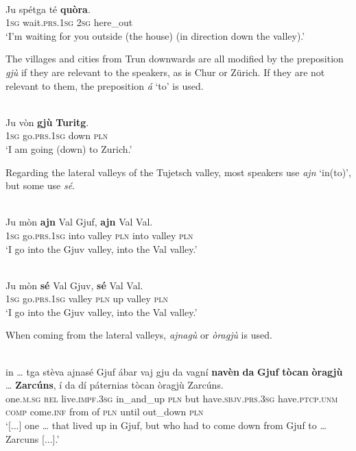 \ea
\label{}
\\
\gll Ju spétga té \textbf{quòra}.\\
\textsc{1sg} wait.\textsc{prs.1sg} \textsc{2sg} here\_out\\
\glt `I'm waiting for you outside (the house) (in direction down the valley).'
\z

The villages and cities from Trun downwards are all modified by the preposition \textit{gjù} if they are relevant to the speakers, as is Chur or Zürich. If they are not relevant to them, the preposition \textit{á} `to' is used.

\ea
\label{}
\\
\gll  Ju vòn \textbf{gjù} \textbf{Turitg}.  \\
\textsc{1sg} go.\textsc{prs.1sg} down \textsc{pln}\\
\glt `I am going (down) to Zurich.'
\z


Regarding the lateral valleys of the Tujetsch valley, most speakers use \textit{ajn} `in(to)', but some use \textit{sé}.

\ea
\label{}
\\
\gll Ju mòn \textbf{ajn} Val Gjuf, \textbf{ajn} Val Val.\\
\textsc{1sg} go.\textsc{prs.1sg} into valley \textsc{pln} into valley \textsc{pln}\\
\glt `I go into the Gjuv valley, into the Val valley.'
\z

\ea
\label{}
\\
\gll Ju mòn \textbf{sé} Val Gjuv, \textbf{sé} Val Val.\\
\textsc{1sg} go.\textsc{prs.1sg} valley \textsc{pln} up valley \textsc{pln}\\
\glt `I go into the Gjuv valley, into the Val valley.'
\z

When coming from the lateral valleys, \textit{ajnagù} or \textit{òragjù} is used.

\ea
\label{}
\\
\gll [...] in … tga stèva ajnasé Gjuf ábar vaj gju da vagní \textbf{navèn} \textbf{da} \textbf{Gjuf} \textbf{tòcan} \textbf{òragjù} … \textbf{Zarcúns}, í da dí páternias tòcan òragjù Zarcúns.\\
{} one.\textsc{m.sg} {} \textsc{rel} live.\textsc{impf.3sg} in\_and\_up \textsc{pln} but  have.\textsc{sbjv.prs.3sg} have.\textsc{ptcp.unm} \textsc{comp} come.\textsc{inf} from of \textsc{pln} until out\_down {} \textsc{pln} \\
\glt `[...] one … that lived up in Gjuf, but who had to come down from Gjuf to … Zarcuns [...].'
\z

